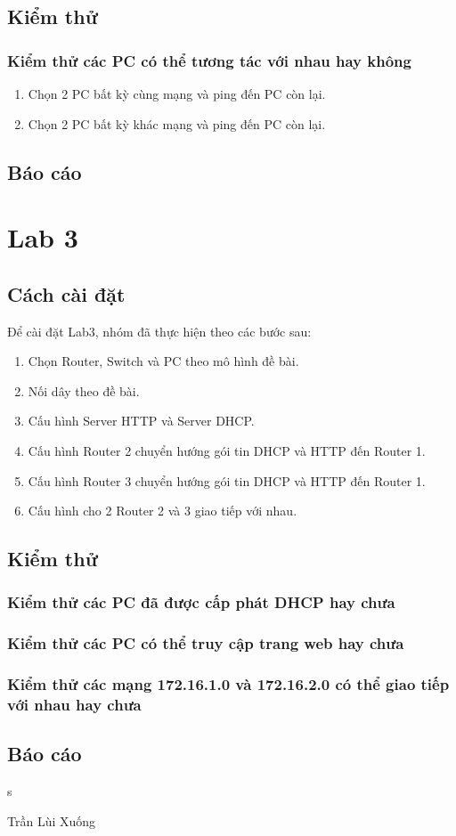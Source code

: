 \documentclass[]{article}
\begin{document}
\subsection{Kiểm thử}
\subsubsection{Kiểm thử các PC có thể tương tác với nhau hay không}
\begin{enumerate}
    \item Chọn 2 PC bất kỳ cùng mạng và ping đến PC còn lại.
    \item Chọn 2 PC bất kỳ khác mạng và ping đến PC còn lại.
\end{enumerate}
\subsection{Báo cáo}

\section{Lab 3}
\subsection{Cách cài đặt}
Để cài đặt Lab3, nhóm đã thực hiện theo các bước sau:
\begin{enumerate}
    \item Chọn Router, Switch và PC theo mô hình đề bài.
    \item Nối dây theo đề bài.
    \item Cấu hình Server HTTP và Server DHCP.
    \item Cấu hình Router 2 chuyển hướng gói tin DHCP và HTTP đến Router 1.
    \item Cấu hình Router 3 chuyển hướng gói tin DHCP và HTTP đến Router 1.
    \item Cấu hình cho 2 Router 2 và 3 giao tiếp với nhau.
\end{enumerate}
\subsection{Kiểm thử}
\subsubsection{Kiểm thử các PC đã được cấp phát DHCP hay chưa}
\subsubsection{Kiểm thử các PC có thể truy cập trang web hay chưa}
\subsubsection{Kiểm thử các mạng 172.16.1.0 và 172.16.2.0 có thể giao tiếp với nhau hay chưa}
\subsection{Báo cáo}
s

\begin{thebibliography}{10}
Trần Lùi Xuống
\end{thebibliography}
\end{document}
